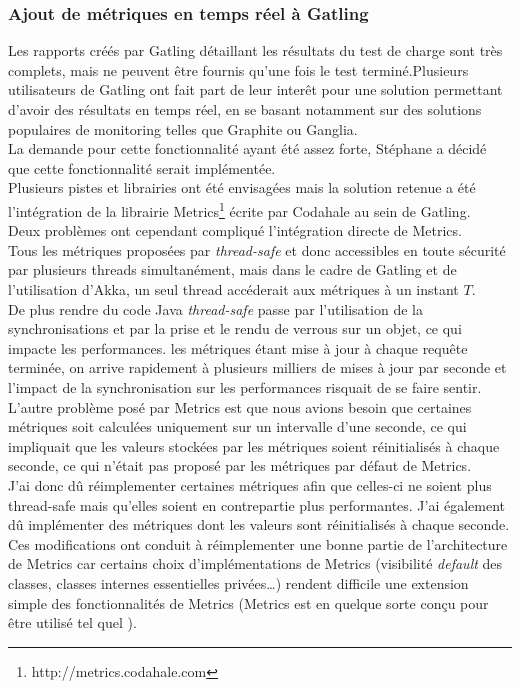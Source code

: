 \subsubsection{Ajout de métriques en temps réel à Gatling}

Les rapports créés par Gatling détaillant les résultats du test de charge sont très complets, mais ne peuvent être fournis qu'une fois le test terminé.Plusieurs utilisateurs de Gatling ont fait part de leur interêt pour une solution permettant d'avoir des résultats en temps réel, en se basant notamment sur des solutions populaires de monitoring telles que Graphite ou Ganglia.\\
La demande pour cette fonctionnalité ayant été assez forte, Stéphane a décidé que cette fonctionnalité serait implémentée.\\

Plusieurs pistes et librairies ont été envisagées mais la solution retenue a été l'intégration de la librairie Metrics\footnote{http://metrics.codahale.com} écrite par Codahale au sein de Gatling.\\

Deux problèmes ont cependant compliqué l'intégration \og directe \fg{}  de Metrics.\\

Tous les métriques proposées par \textit{thread-safe} et donc accessibles en toute sécurité par plusieurs threads simultanément, mais dans le cadre de Gatling et de l'utilisation d'Akka, un seul thread accéderait aux métriques à un instant $T$.\\
De plus rendre du code Java \textit{thread-safe} passe par l'utilisation de la synchronisations et par la prise et le rendu de verrous sur un objet, ce qui impacte les performances. les métriques étant mise à jour à chaque requête terminée, on arrive rapidement à plusieurs milliers de mises à jour par seconde et l'impact de la synchronisation sur les performances risquait de se faire sentir.\\

L'autre problème posé par Metrics est que nous avions besoin que certaines métriques soit calculées uniquement sur un intervalle d'une seconde, ce qui impliquait que les valeurs stockées par les métriques soient réinitialisés à chaque seconde, ce qui n'était pas proposé par les métriques par défaut de Metrics.\\  

J'ai donc dû réimplementer certaines métriques afin que celles-ci ne soient plus thread-safe mais qu'elles soient en contrepartie plus performantes. J'ai également dû implémenter des métriques dont les valeurs sont réinitialisés à chaque seconde.\\
Ces modifications ont conduit à réimplementer une bonne partie de l'architecture de Metrics car certains choix d'implémentations de Metrics (visibilité \textit{default} des classes, classes internes essentielles privées\ldots) rendent difficile une extension simple des fonctionnalités de Metrics (Metrics est en quelque sorte conçu pour être utilisé \og tel quel \fg{}).  \\

